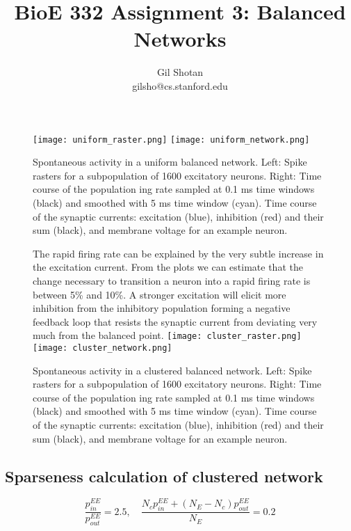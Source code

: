 \documentclass[10pt]{article}
\begin{document}
\title{BioE 332 Assignment 3: Balanced Networks}
\author{Gil Shotan \\ gilsho@cs.stanford.edu}

\maketitle

%
%

\begin{figure}[h!]
  \centering
    \texttt{[image: uniform\_raster.png]}
     \texttt{[image: uniform\_network.png]}
    \caption{Spontaneous activity in a uniform balanced network. Left: Spike rasters for a subpopulation of 1600 excitatory neurons. Right: Time course of the population  ing rate sampled at 0.1 ms time windows (black) and smoothed with 5 ms time window (cyan). Time course of the synaptic currents:
excitation (blue), inhibition (red) and their sum (black), and membrane voltage for an
example neuron.}
\end{figure}
\begin{figure}[h!]
The rapid firing rate can be explained by the very subtle increase in the excitation current. From the plots we can estimate that the change necessary to transition a neuron into a rapid firing rate is between 5\% and 10\%. A stronger excitation will elicit more inhibition from the inhibitory population forming a negative feedback loop that resists the synaptic current from deviating very much from the balanced point.
  \centering
    \texttt{[image: cluster\_raster.png]}
     \texttt{[image: cluster\_network.png]}
      \caption{Spontaneous activity in a clustered balanced network. Left: Spike rasters for a subpopulation of 1600 excitatory neurons. Right: Time course of the population  ing rate sampled at 0.1 ms time windows (black) and smoothed with 5 ms time window (cyan). Time course of the synaptic currents: excitation (blue), inhibition (red) and their sum (black), and membrane voltage for an
example neuron.}
\end{figure}

\subsection*{Sparseness calculation of clustered network}
\[
\frac{p^{EE}_{in}}{p^{EE}_{out}} = 2.5,
\quad
\frac{N_cp^{EE}_{in} + (N_E - N_c)p^{EE}_{out}}{N_E} = 0.2
\]
\end{document}
